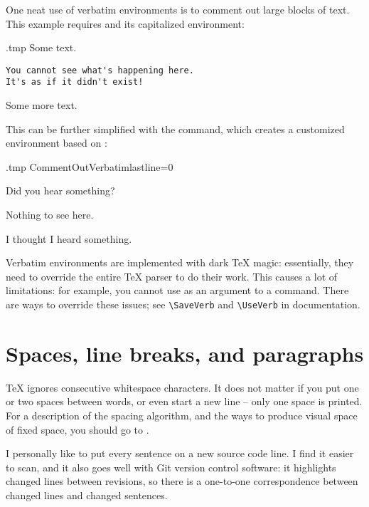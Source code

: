 One neat use of verbatim environments is to comment out large blocks of text.
%
This example requires  and its capitalized  environment:
%
\begin{VerbatimOut}{\jobname.tmp}
Some text.
\begin{Verbatim}[lastline=0]
You cannot see what's happening here.
It's as if it didn't exist!
\end{Verbatim}
Some more text.
\end{VerbatimOut}
\ShowExample
%
This can be further simplified with the  command,
which creates a customized environment based on :
%
\begin{VerbatimOut}{\jobname.tmp}
\DefineVerbatimEnvironment
    {CommentOut}{Verbatim}{lastline=0}

Did you hear something?
\begin{CommentOut}
Nothing to see here.
\end{CommentOut}
I thought I heard something.
\end{VerbatimOut}
\ShowExample

\begin{technote}
Verbatim environments are implemented with dark \TeX{} magic:
essentially, they need to override the entire \TeX{} parser to do their work.
This causes a lot of limitations:
for example, you cannot use  as an argument to a command.
There are ways to override these issues;
see \verb|\SaveVerb| and \verb|\UseVerb| in  documentation.
\end{technote}


%
%
%
\section{Spaces, line breaks, and paragraphs}

\TeX{} ignores consecutive whitespace characters.
It does not matter if you put one or two spaces between words,
or even start a new line -- only one space is printed.
For a description of the spacing algorithm, and the ways to produce visual space of fixed space,
you should go to .

\begin{practices}
I personally like to put every sentence on a new source code line.
I find it easier to scan,
and it also goes well with Git version control software:
it highlights changed lines between revisions,
so there is a one-to-one correspondence between changed lines and changed sentences.
\end{practices}

